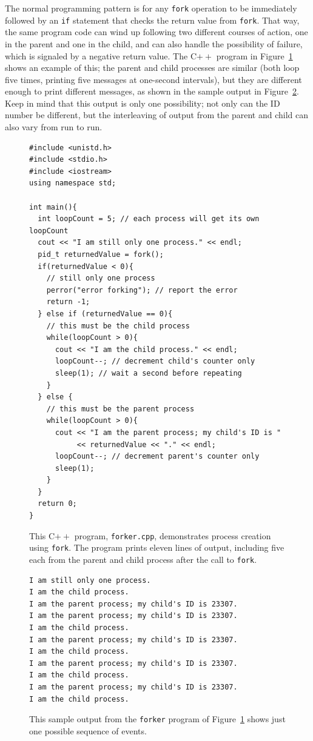 The normal programming pattern is for any {\tt fork} operation to be
immediately followed by  an \verb|if| statement that checks
the return value from \verb|fork|.  That way, the same program code can wind up
following two different courses of action, one in the parent and one
in the child, and can also handle the possibility of failure, which is
signaled by a negative return value.
The C$++$ program in Figure~\ref{forker-code} shows an example of this;
the parent and child processes are similar (both loop five times,
printing five messages at one-second intervals), but they are
different enough to print different messages, as shown in the sample
output in Figure~\ref{forker-output}.  Keep in mind that this output
is only one possibility; not only can the ID number be different, but the
interleaving of output from the parent and child can also vary from
run to run.
\begin{figure}
\begin{verbatim}
#include <unistd.h>
#include <stdio.h>
#include <iostream>
using namespace std;

int main(){
  int loopCount = 5; // each process will get its own loopCount
  cout << "I am still only one process." << endl;
  pid_t returnedValue = fork();
  if(returnedValue < 0){
    // still only one process
    perror("error forking"); // report the error
    return -1;
  } else if (returnedValue == 0){
    // this must be the child process
    while(loopCount > 0){
      cout << "I am the child process." << endl;
      loopCount--; // decrement child's counter only
      sleep(1); // wait a second before repeating
    }
  } else {
    // this must be the parent process
    while(loopCount > 0){
      cout << "I am the parent process; my child's ID is "
           << returnedValue << "." << endl;
      loopCount--; // decrement parent's counter only
      sleep(1);
    }
  }
  return 0;
}
\end{verbatim}
\caption{This C$++$ program, {\tt forker.cpp}, demonstrates process
  creation using {\tt fork}.  The program prints eleven lines of output,
  including five each from the parent and child process after the call
  to {\tt fork}.}
\label{forker-code}
\end{figure}
\begin{figure}
\begin{verbatim}
I am still only one process.
I am the child process.
I am the parent process; my child's ID is 23307.
I am the parent process; my child's ID is 23307.
I am the child process.
I am the parent process; my child's ID is 23307.
I am the child process.
I am the parent process; my child's ID is 23307.
I am the child process.
I am the parent process; my child's ID is 23307.
I am the child process.
\end{verbatim}
\caption{This sample output from the {\tt forker} program of
  Figure~\ref{forker-code} shows just one possible sequence of
  events.}
\label{forker-output}
\end{figure}
